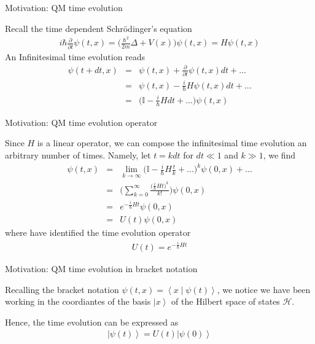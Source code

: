\documentclass{beamer}
\newcommand{\ket}[1]{\left| #1 \right\rangle}
\newcommand{\braket}[2]{\left\langle #1 \middle| #2  \right\rangle}
\begin{document}

\begin{frame}{Motivation: QM time evolution}

Recall the time dependent Schr\"odinger's equation
\begin{eqnarray}
i\hbar
\frac{\partial}{\partial t}
\psi(t,x)
=
\bigg(
\frac{\hbar^2}{2m}
\Delta
+
V(x)
\bigg)
\psi(t,x)
=
H
\psi(t,x)
\end{eqnarray}
An Infinitesimal time evolution reads
\begin{eqnarray}
\psi(t+dt,x)
&=&
\psi(t,x)
+
\frac{\partial}{\partial t}
\psi(t,x)
dt
+
...
\\
&=&
\psi(t,x)
-
\frac{i}{\hbar}H
\psi(t,x)
dt
+
...
\nonumber
\\
&=&
\bigg(
\mathbb{I}
-
\frac{i}{\hbar}H
dt
+
...
\bigg)
\psi(t,x)
\nonumber
\end{eqnarray}

\end{frame}



\begin{frame}{Motivation: QM time evolution operator}

Since $H$ is a linear operator, we can compose the infinitesimal time evolution an arbitrary number of times. 
Namely, let $t=k dt$ for $dt\ll 1$ and $k \gg 1$, we find
\begin{eqnarray}
\psi(t,x)
&=&
\lim_{k\to \infty}
\bigg(
\mathbb{I}
-
\frac{i}{\hbar}H
\frac{t}{k}
+
...
\bigg)^k
\psi(0,x)
+
...
\\
&=&
\bigg(
\sum_{k=0}^{\infty}
\frac{
\big(\frac{i}{\hbar}H t\big)^k
}{k!}
\bigg)
\psi(0,x)
\nonumber
\\
&=&
e^{-\frac{i}{\hbar}H t}
\psi(0,x)
\nonumber
\\
&=&
U(t)
\psi(0,x)
\nonumber
\end{eqnarray}
where have identified the time evolution operator
\begin{eqnarray}
U(t)
=
e^{-\frac{i}{\hbar}Ht}
\end{eqnarray}

\end{frame}


\begin{frame}{Motivation: QM time evolution in bracket notation}

Recalling the bracket notation $\psi(t,x)=\braket{x}{\psi(t)}$, we notice we have been working in the coordiantes of the basis $\ket{x}$ of the Hilbert space of states $\mathcal{H}$.

\vspace{.25cm}

Hence, the time evolution can be expressed as
\begin{eqnarray}
\ket{\psi(t)}
=
U(t)
\ket{\psi(0)}
\end{eqnarray}

\end{frame}
\end{document}
